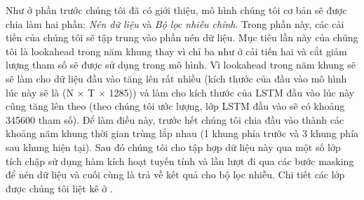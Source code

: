 			Như ở phần trước chúng tôi đã có giới thiệu, mô hình chúng tôi cơ bản sẽ được chia làm hai phần: \textit{Nén dữ liệu} và \textit{Bộ lọc nhiễu chính}. Trong phần này, các cải tiến của chúng tôi sẽ tập trung vào phần nén dữ liệu. Mục tiêu lần này của chúng tôi là lookahead trong năm khung thay vì chỉ ba như ở cải tiến hai và cắt giảm lượng tham số sẽ được sử dụng trong mô hình. Vì lookahead trong năm khung sẽ sẽ làm cho dữ liệu đầu vào tăng lên rất nhiều (kích thước của đầu vào mô hình lúc này sẽ là (N $\times$ T $\times$ 1285)) và làm cho kích thước của LSTM đầu vào lúc này cũng tăng lên theo (theo chúng tôi ước lượng, lớp LSTM đầu vào sẽ có khoảng 345600 tham số). Để làm điều này, trước hết chúng tôi chia đầu vào thành các khoảng năm khung thời gian trùng lắp nhau (1 khung phía trước và 3 khung phía sau khung hiện tại). Sau đó chúng tôi cho tập hợp dữ liệu này qua một số lớp tích chập sử dụng hàm kích hoạt tuyến tính và lần lượt đi qua các bước masking để nén dữ liệu và cuối cùng là trả về kết quả cho bộ lọc nhiễu. Chi tiết các lớp được chúng tôi liệt kê ở .
			
